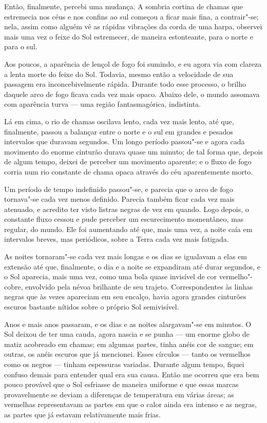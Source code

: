 Então, finalmente, percebi uma mudança. A sombria cortina de chamas que estremecia nos céus e nos confins ao sul
começou a ficar mais fina, a contrair"-se; nela, assim como alguém vê as rápidas vibrações da corda de uma harpa, observei
mais uma vez o feixe do Sol estremecer, de maneira estonteante, para o norte e para o sul.

Aos poucos, a aparência de lençol de fogo foi sumindo, e eu agora via com clareza a lenta morte do feixe do Sol.
Todavia, mesmo então a velocidade de sua passagem era inconcebivelmente rápida. Durante todo esse processo, o brilho
daquele arco de fogo ficava cada vez mais opaco. Abaixo dele, o mundo assomava com aparência turva --- uma região
fantasmagórica, indistinta.

Lá em cima, o rio de chamas oscilava lento, cada vez mais lento, até que, finalmente, passou a balançar entre o norte e
o sul em grandes e pesados intervalos que duravam segundos. Um longo período passou"-se e agora cada movimento do
enorme cinturão durava quase um minuto; de tal forma que, depois de algum tempo, deixei de perceber um movimento
aparente; e o fluxo de fogo corria num rio constante de chama opaca através do céu aparentemente morto.

Um período de tempo indefinido passou"-se, e parecia que o arco de fogo tornava"-se cada vez menos definido. Parecia
também ficar cada vez mais atenuado, e acredito ter visto listras negras de vez em quando. Logo depois, o constante fluxo
cessou e pude perceber um escurecimento momentâneo, mas regular, do mundo. Ele foi aumentando até que, mais uma vez, a
noite caía em intervalos breves, mas periódicos, sobre a Terra cada vez mais fatigada. 

As noites tornaram"-se cada vez mais longas e os dias se igualavam a elas em extensão até que, finalmente, o dia e a
noite se expandiram até durar segundos, e o Sol aparecia, mais uma vez, como uma bola quase invisível de cor
vermelho"-cobre, envolvido pela névoa brilhante de seu trajeto. Correspondentes às linhas negras que às vezes apareciam
em seu encalço, havia agora grandes cinturões escuros bastante nítidos sobre o próprio Sol semivisível.

Anos e mais anos passaram, e os dias e as noites alargavam"-se em minutos. O Sol deixou de ter uma cauda, agora nascia
e se punha --- um enorme globo de matiz acobreado em chamas; em algumas partes, tinha anéis cor de sangue; em outras, os
anéis escuros que já mencionei. Esses círculos --- tanto os vermelhos como os negros --- tinham espessuras variadas.
Durante algum tempo, fiquei confuso demais para entender qual era sua causa. Então me ocorreu que era bem pouco
provável que o Sol esfriasse de maneira uniforme e que essas marcas provavelmente se deviam a diferenças de
temperatura em várias áreas; as vermelhas representavam as partes em que o calor ainda era intenso e as negras,
as partes que já estavam relativamente mais frias.

